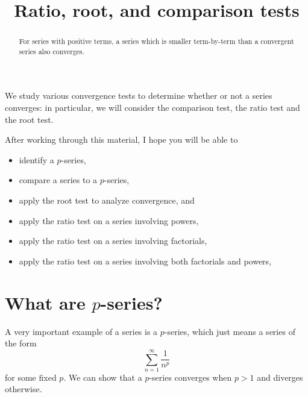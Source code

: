 \documentclass{ximera}
\title{Ratio, root, and comparison tests}
\begin{document}
\begin{abstract}
  For series with positive terms, a series which is smaller term-by-term than a convergent series also converges.
\end{abstract}

\maketitle

We study various convergence tests to determine whether or not a
series converges: in particular, we will consider the comparison test,
the ratio test and the root test.

After working through this material, I hope you will be able to
\begin{itemize}
\item identify a \(p\)-series,
\item compare a series to a \(p\)-series,
\item apply the root test to analyze convergence, and
\item apply the ratio test on a series involving powers,
\item apply the ratio test on a series involving factorials,
\item apply the ratio test on a series involving both factorials and powers,
\end{itemize}

\section{What are \(p\)-series?}

A very important example of a series is a \(p\)-series, which just means a series of the form \[\sum_{n=1}^\infty \frac{1}{n^p}\] for some fixed \(p\).  We can show that a \(p\)-series converges when \(p > 1\) and diverges otherwise.

\end{document}

